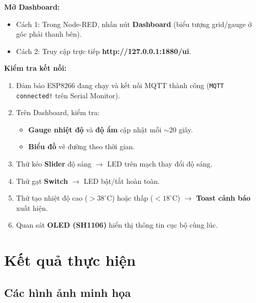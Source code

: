 \documentclass[13pt,a4paper]{article}
\newcommand{\code}[1]{\texttt{#1}}
\begin{document}
\textbf{Mở Dashboard:}

\begin{itemize}
    \item Cách 1: Trong Node-RED, nhấn nút \textbf{Dashboard} (biểu tượng grid/gauge ở góc phải thanh bên).
    \item Cách 2: Truy cập trực tiếp \textbf{http://127.0.0.1:1880/ui}.
\end{itemize}

\textbf{Kiểm tra kết nối:}

\begin{enumerate}[label=\arabic*., leftmargin=1.5cm]
    \item Đảm bảo ESP8266 đang chạy và kết nối MQTT thành công (\code{MQTT connected!} trên Serial Monitor).
    \item Trên Dashboard, kiểm tra:
    \begin{itemize}
        \item \textbf{Gauge nhiệt độ} và \textbf{độ ẩm} cập nhật mỗi $\sim$20 giây.
        \item \textbf{Biểu đồ} vẽ đường theo thời gian.
    \end{itemize}
    \item Thử kéo \textbf{Slider} độ sáng $\rightarrow$ LED trên mạch thay đổi độ sáng.
    \item Thử gạt \textbf{Switch} $\rightarrow$ LED bật/tắt hoàn toàn.
    \item Thử tạo nhiệt độ cao ($>38^\circ$C) hoặc thấp ($<18^\circ$C) $\rightarrow$ \textbf{Toast cảnh báo} xuất hiện.
    \item Quan sát \textbf{OLED (SH1106)} hiển thị thông tin cục bộ cùng lúc.
\end{enumerate}

\section{Kết quả thực hiện}
\label{sec:ketqua}

\subsection{Các hình ảnh minh họa}
\label{sec:hinh}
\end{document}
